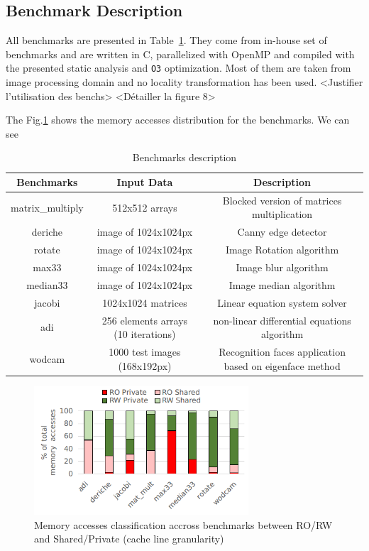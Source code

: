 \documentclass[sigconf]{acmart}
\begin{document}
\subsection{Benchmark Description}

All benchmarks are presented in Table~\ref{benchs}. They come from in-house set of benchmarks and are written in C, parallelized with OpenMP and compiled with the presented static analysis and \texttt{O3} optimization. Most of them are taken from image processing domain and no locality transformation has been used. 
<Justifier l'utilisation des benchs>
<Détailler la figure 8>

The Fig.\ref{benchsCarac} shows the memory accesses distribution for the benchmarks. We can see 

\begin{table}
\centering
\caption{Benchmarks description}
\label{benchs}
\begin{tabular}{ |c|c|c| }
\hline
\hline
  \textbf{Benchmarks} &  \textbf{Input Data} & \textbf{Description} \\
\hline
 matrix\_multiply & 512x512 arrays&  Blocked version of matrices multiplication\\ 
\hline
 deriche & image of 1024x1024px& Canny edge detector\\
\hline
 rotate & image of 1024x1024px &  Image Rotation algorithm \\
\hline
 max33 &  image of 1024x1024px & Image blur algorithm \\
\hline
 median33 &  image of 1024x1024px& Image median algorithm\\
\hline
 jacobi & 1024x1024 matrices  & Linear equation system solver \\ 
\hline
 adi & 256 elements arrays (10 iterations) &  non-linear differential equations algorithm\\
\hline
 wodcam & 1000 test images (168x192px) &Recognition faces application based on eigenface method\\
\hline
\hline
\end{tabular}
\end{table}


\begin{figure}
    \centering
    \includegraphics[width=8cm]{./images/benchs.png}
    \caption{Memory accesses classification accross benchmarks between RO/RW and Shared/Private (cache line granularity)}
    \label{benchsCarac}
\end{figure}
\end{document}

